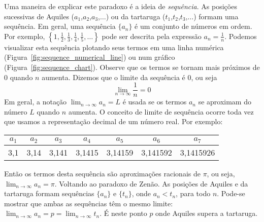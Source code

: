 \noindent Uma maneira de explicar este paradoxo é a ideia de \emph{sequência}. As posições sucessivas de Aquiles ($a_1$,$a_2$,$a_3$,$\dots$) ou da tartaruga ($t_1$,$t_2$,$t_3$,$\dots$) formam uma sequência. Em geral, uma sequência $\{a_n\}$ é um conjunto de números em ordem. Por exemplo, $\left\{1,\frac{1}{2},\frac{1}{3},\frac{1}{4},\frac{1}{5},\dots\right\}$ pode ser descrita pela expressão $a_n=\frac{1}{n}$. Podemos visualizar esta sequência plotando seus termos em uma linha numérica (Figura~\ref{fig:sequence_numerical_line}) ou num gráfico (Figura~\ref{fig:sequence_chart}). Observe que os termos se tornam mais próximos de 0 quando $n$ aumenta. Dizemos que o limite da sequência é 0, ou seja $$\lim_{n\rightarrow\infty}\frac{1}{n}=0$$
Em geral, a notação $\lim_{n\rightarrow\infty}a_n=L$ é usada se os termos $a_n$ se aproximam do número $L$ quando $n$ aumenta.
O conceito de limite de sequência ocorre toda vez que usamos a representação decimal de um número real. Por exemplo:
\begin{table}[!ht]
  \centering
  \setlength\tabcolsep{0.15cm}
  \begin{tabular}{|c|c|c|c|c|c|c|}\hline
    $a_1$&$a_2$&$a_3$&$a_4$&$a_5$&$a_6$&$a_7$\\\hline
    3,1&3,14&3,141&3,1415&3,14159&3,141592&3,1415926\\\hline
  \end{tabular}
\end{table}

\noindent Então os termos desta sequência são aproximações racionais de $\pi$, ou seja, $\lim_{n\rightarrow \infty}a_n=\pi$. Voltando ao paradoxo de Zenão. As posições de Aquiles e da tartaruga formam sequências $\{a_n\}$ e $\{t_n\}$, onde $a_n<t_n$, para todo $n$. Pode-se mostrar que ambas as sequências têm o mesmo limite: $\lim_{n\rightarrow\infty}a_n=p=\lim_{n\rightarrow\infty}t_n$. É neste ponto $p$ onde Aquiles supera a tartaruga.

